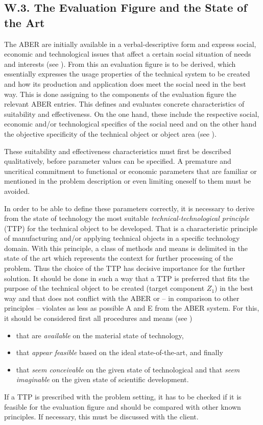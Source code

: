 \documentclass[11pt,a4paper]{article}
\begin{document}
\subsection*{W.3. The Evaluation Figure and the State of the Art}

The ABER are initially available in a verbal-descriptive form and express
social, economic and technological issues that affect a certain social
situation of needs and interests (see \cite[A.1]{RM-21}). From this an
evaluation figure is to be derived, which essentially expresses the usage
properties of the technical system to be created and how its production and
application does meet the social need in the best way. This is done assigning
to the components of the evaluation figure the relevant ABER entries. This
defines and evaluates concrete characteristics of suitability and
effectiveness. On the one hand, these include the respective social, economic
and/or technological specifics of the social need and on the other hand the
objective specificity of the technical object or object area (see
\cite[(1.3)]{RM-21}).

These suitability and effectiveness characteristics must first be described
qualitatively, before parameter values can be specified. A premature and
uncritical commitment to functional or economic parameters that are familiar
or mentioned in the problem description or even limiting oneself to them must
be avoided.

In order to be able to define these parameters correctly, it is necessary to
derive from the state of technology the most suitable
\emph{technical-technological principle} (TTP) for the technical object to be
developed. That is a characteristic principle of manufacturing and/or applying
technical objects in a specific technology domain. With this principle, a
class of methods and means is delimited in the state of the art which
represents the context for further processing of the problem. Thus the choice
of the TTP has decisive importance for the further solution. It should be done
in such a way that a TTP is preferred that fits the purpose of the technical
object to be created (target component $Z_1$) in the best way and that does
not conflict with the ABER or -- in comparison to other principles -- violates
as less as possible A and E from the ABER system. For this, it should be
considered first all procedures and means (see \cite[Appendix 1]{ProHEAL-21})
\begin{itemize}
\item that are \emph{available} on the material state of technology,
\item that \emph{appear feasible} based on the ideal state-of-the-art, and
  finally
\item that \emph{seem conceivable} on the given state of technological and
  that \emph{seem imaginable} on the given state of scientific development.
\end{itemize}
If a TTP is prescribed with the problem setting, it has to be checked if it is
feasible for the evaluation figure and should be compared with other known
principles. If necessary, this must be discussed with the client.
\end{document}
